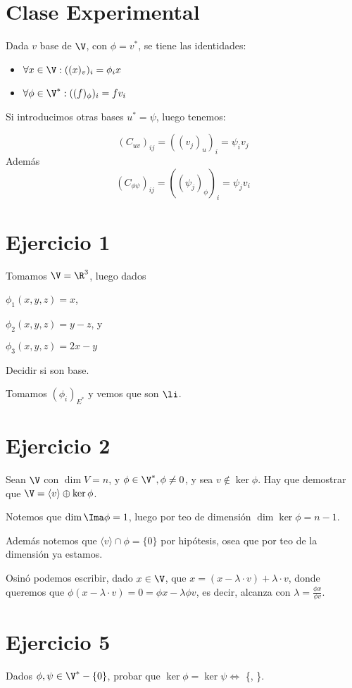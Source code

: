 \documentclass{article}
\begin{document}
\section*{Clase Experimental}
Dada $v$ base de $\V$, con $\phi = v^*$, se tiene las identidades:
\begin{itemize}
	\item $\forall x \in \V : ((x)_v)_i = \phi_ix$
	\item $\forall \phi \in \V^* : ((f)_\phi)_i = f v_i$
\end{itemize}

Si introducimos otras bases $u^* = \psi$, luego tenemos:

\[
(C_{uv})_{ij} = ((v_j)_u)_i = \psi_i v_j
\]
Además
\[
(C_{\phi \psi})_{ij} = ((\psi_j)_\phi)_i = \psi_j v_i
\]

\section*{Ejercicio 1}
Tomamos $\V = \R^3$, luego dados

$\phi_1 (x,y,z) = x$,

$\phi_2 (x, y, z) = y-z$, y

$\phi_3 (x,y,z) = 2x-y$

Decidir si son base.

Tomamos $(\phi_i)_{E^*}$ y vemos que son $\li$.

\section*{Ejercicio 2}
Sean $\V$ con $\dim V = n$, y $\phi \in \V^*, \phi \neq 0$, y sea $v \notin
\ker \phi$. Hay que demostrar que $\V = \langle v \rangle \oplus \ker \phi$.

Notemos que $\dim \Ima \phi = 1$, luego por teo de dimensión $\dim \ker \phi =
n-1$.

Además notemos que $\langle v \rangle \cap \phi = \{0\}$ por hipótesis, osea
que por teo de la dimensión ya estamos.

Osinó podemos escribir, dado $x \in \V$, que $x = (x - \lambda \cdot v) +
\lambda \cdot v$, donde queremos que $\phi (x - \lambda \cdot v) = 0 = \phi x
-\lambda \phi v$, es decir, alcanza con $\lambda = \frac{\phi x}{\phi v}$.

\section*{Ejercicio 5}
Dados $\phi, \psi \in \V^* - \{0\}$, probar que $\ker \phi = \ker \psi \iff$
\{\phi, \psi\}.
\end{document}
